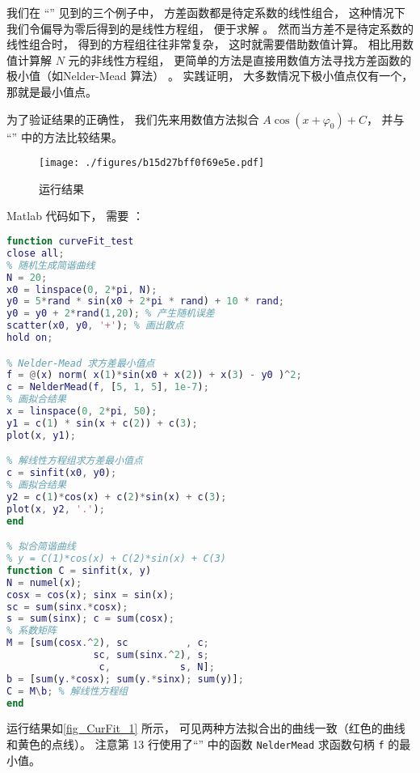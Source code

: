 
我们在 “” 见到的三个例子中， 方差函数都是待定系数的线性组合， 这种情况下我们令偏导为零后得到的是线性方程组， 便于求解 %
。 然而当方差不是待定系数的线性组合时， 得到的方程组往往非常复杂， 这时就需要借助数值计算。 相比用数值计算解 $N$ 元的非线性方程组， 更简单的方法是直接用数值方法寻找方差函数的极小值（如Nelder-Mead 算法） 。 实践证明， 大多数情况下极小值点仅有一个， 那就是最小值点。

为了验证结果的正确性， 我们先来用数值方法拟合 $A\cos (x + \varphi_0) + C$， 并与 “” 中的方法比较结果。

\begin{figure}[ht]
\centering
\texttt{[image: ./figures/b15d27bff0f69e5e.pdf]}
\caption{运行结果} \label{fig_CurFit_1}
\end{figure}

Matlab 代码如下， 需要 ：
\begin{lstlisting}[language=matlab, caption=curveFit\_test.m]
function curveFit_test
close all;
% 随机生成简谐曲线
N = 20;
x0 = linspace(0, 2*pi, N);
y0 = 5*rand * sin(x0 + 2*pi * rand) + 10 * rand;
y0 = y0 + 2*rand(1,20); % 产生随机误差
scatter(x0, y0, '+'); % 画出散点
hold on;

% Nelder-Mead 求方差最小值点
f = @(x) norm( x(1)*sin(x0 + x(2)) + x(3) - y0 )^2;
c = NelderMead(f, [5, 1, 5], 1e-7);
% 画拟合结果
x = linspace(0, 2*pi, 50);
y1 = c(1) * sin(x + c(2)) + c(3);
plot(x, y1);

% 解线性方程组求方差最小值点
c = sinfit(x0, y0);
% 画拟合结果
y2 = c(1)*cos(x) + c(2)*sin(x) + c(3);
plot(x, y2, '.');
end

% 拟合简谐曲线
% y = C(1)*cos(x) + C(2)*sin(x) + C(3)
function C = sinfit(x, y)
N = numel(x);
cosx = cos(x); sinx = sin(x);
sc = sum(sinx.*cosx);
s = sum(sinx); c = sum(cosx);
% 系数矩阵
M = [sum(cosx.^2), sc          , c;
               sc, sum(sinx.^2), s;
                c,            s, N];
b = [sum(y.*cosx); sum(y.*sinx); sum(y)];
C = M\b; % 解线性方程组
end
\end{lstlisting}

运行结果如\autoref{fig_CurFit_1} 所示， 可见两种方法拟合出的曲线一致（红色的曲线和黄色的点线）。 注意第 13 行使用了“” 中的函数 \verb|NelderMead| 求函数句柄 \verb|f| 的最小值。

